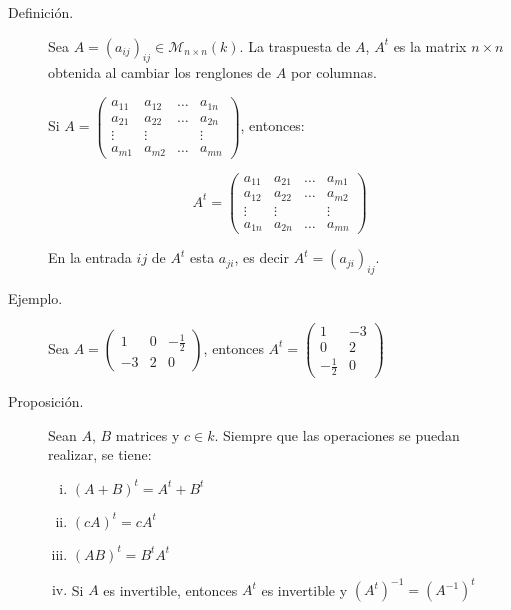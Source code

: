 \documentclass[12pt]{article}
\begin{document}
\begin{description}
\begin{enumerate}
\end{enumerate}

\item [Definición.] Sea $A = (a_{ij})_{ij} \in \mathcal{M}_{n \times n}(k)$. La traspuesta de $A$, $A^t$ es la matrix $n \times n$ obtenida al cambiar los renglones de $A$ por columnas.

Si $A =
\begin{pmatrix}
a_{11} & a_{12} & \dots & a_{1n} \\
a_{21} & a_{22} & \dots & a_{2n} \\
\vdots & \vdots &       & \vdots \\
a_{m1} & a_{m2} & \dots & a_{mn}
\end{pmatrix}$, entonces:

\begin{equation}
A^t =
\begin{pmatrix}
a_{11} & a_{21} & \dots & a_{m1} \\
a_{12} & a_{22} & \dots & a_{m2} \\
\vdots & \vdots &       & \vdots \\
a_{1n} & a_{2n} & \dots & a_{mn}
\end{pmatrix}
\end{equation}

En la entrada $ij$ de $A^t$ esta $a_{ji}$, es decir $A^t = (a_{ji})_{ij}$.

\item [Ejemplo.] Sea 
\begin{math}
A =
\begin{pmatrix}
1 & 0 & -\frac{1}{2} \\
-3 & 2 & 0
\end{pmatrix}
\end{math}, entonces 
\begin{math}
A^t =
\begin{pmatrix}
1 & -3 \\
0 & 2  \\
-\frac{1}{2} & 0
\end{pmatrix}
\end{math}

\item [Proposición.] Sean $A$, $B$ matrices y $c \in k$. Siempre que las operaciones se puedan realizar, se tiene:

\begin{enumerate}[i)]
\item $(A + B)^t = A^t + B^t$
\item $(c A)^t = c A^t$
\item $(A B)^t = B^t A^t$
\item Si $A$ es invertible, entonces $A^t$ es invertible y $(A^t)^{-1} = (A^{-1})^t$
\end{enumerate}


\end{description}
\end{document}
